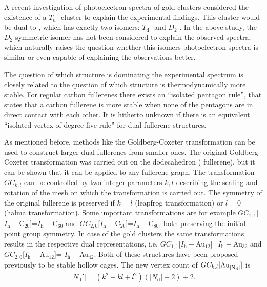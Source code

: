 A recent investigation of photoelectron spectra of gold clusters considered the
existence of a $T_\text{d}$- cluster to explain the experimental
findings.\autocite{Bulusu_Evidencehollowgolden_2006} This cluster would be dual
to , which has exactly two isomers: $T_\text{d}$- and
$D_2$-. In the above study, the $D_2$-symmetric isomer has not been
considered to explain the observed spectra, which naturally raises the question
whether this isomers photoelectron spectra is similar or even capable of
explaining the observations better. 

The question of which structure is dominating the experimental spectrum is
closely related to the question of which structure is thermodynamically more stable. For regular
carbon fullerenes there exists an ``isolated pentagon rule'', that states that a
carbon fullerene is more stable when none of the pentagons are in direct contact
with each other.\autocite{Kroto_stabilityfullerenesCn_1987} It is hitherto
unknown if there is an equivalent ``isolated vertex of degree five rule'' for
dual fullerene structures.

As mentioned before, methods like the Goldberg-Coxeter transformation can be used
to construct larger dual fullerenes from smaller
ones.\autocite{Goldberg_ClassMultiSymmetricPolyhedra_1937,Coxeter-1971,Dutour_GoldbergCoxeterConstructionvalent_2004}
The original Goldberg-Coxeter transformation was carried out on the dodecahedron (
fullerene)\autocite{Goldberg_ClassMultiSymmetricPolyhedra_1937,Coxeter-1971}, but
it can be shown that it can be applied to any fullerene
graph.\autocite{Schwerdtfeger_topologyfullerenes_2015} The transformation
$GC_{k,l}$ can be controlled by two integer parameters $k,l$ describing the
scaling and rotation of the mesh on which the transformation is carried out. The
symmetry of the original fullerene is preserved if $k=l$ (leapfrog
transformation) or $l=0$  (halma transformation). Some important transformations
are for example
$GC_{1,1}$[$I_\mathrm{h}-$C$_{20}$]=$I_\mathrm{h}-$C$_{60}$\autocite{Fowler-atlas-2006}
and $GC_{2,0}$[$I_\mathrm{h}-$C$_{20}$]=$I_\mathrm{h}-$C$_{80}$, both preserving
the initial point group symmetry. In case of the gold clusters the same
transformations results in the respective dual representations, i.e.
$GC_{1,1}$[$I_\mathrm{h}-$Au$_{12}$]=$I_\mathrm{h}-$Au$_{32}$ and
$GC_{2,0}$[$I_\mathrm{h}-$Au$_{12}$]= $I_\mathrm{h}-$Au$_{42}$. Both of these
structures have been proposed previously to be stable
hollow cages.\autocite{Johansson_Au3224CaratGolden_2004} The new vertex count of
$GC_{k,l}[\ce{Au_{|N_d|}}]$ is
%
\begin{align}
    |N_\text{d}'| = (k^2+kl+l^2)(|N_\text{d}|-2) + 2.\label{eqn:dualvertex}
\end{align}

